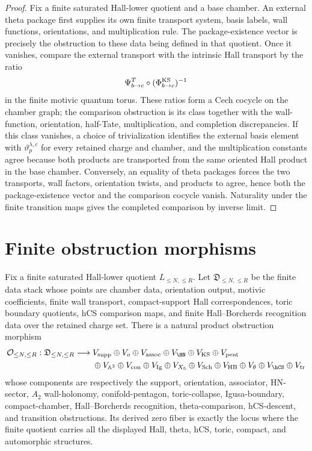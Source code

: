 \begin{proof}
Fix a finite saturated Hall-lower quotient and a base chamber. An
external theta package first supplies its own finite transport system,
basis labels, wall functions, orientations, and multiplication rule.
The package-existence vector is precisely the obstruction to these data
being defined in that quotient. Once it vanishes, compare the external
transport with the intrinsic Hall transport by the ratio
\[
\Psi^{T}_{b\to c}\circ(\Phi^{\mathrm{KS}}_{b\to c})^{-1}
\]
in the finite motivic quantum torus. These ratios form a Cech cocycle
on the chamber graph; the comparison obstruction is its class together
with the wall-function, orientation, half-Tate, multiplication, and
completion discrepancies. If this class vanishes, a choice of
trivialization identifies the external basis element with
\(\vartheta^{\lambda,c}_p\) for every retained charge and chamber, and
the multiplication constants agree because both products are transported
from the same oriented Hall product in the base chamber. Conversely,
an equality of theta packages forces the two transports, wall factors,
orientation twists, and products to agree, hence both the
package-existence vector and the comparison cocycle vanish. Naturality
under the finite transition maps gives the completed comparison by
inverse limit.
\end{proof}

\section{Finite obstruction morphisms}

\begin{theorem}
\label{thm:bps-positive-finite-obstruction-morphism}
Fix a finite saturated Hall-lower quotient \(L_{\leq N,\leq R}\). Let
\(\mathfrak D_{\leq N,\leq R}\) be the finite data stack whose points
are chamber data, orientation output, motivic coefficients, finite
wall transport, compact-support Hall correspondences, toric boundary
quotients, hCS comparison maps, and finite Hall--Borcherds recognition
data over the retained charge set. There is a natural product
obstruction morphism
\[
\mathcal O_{\leq N,\leq R}:
\mathfrak D_{\leq N,\leq R}
\longrightarrow
\begin{aligned}[t]
&V_{\mathrm{supp}}\oplus V_o\oplus V_{\mathrm{assoc}}
\oplus V_{\HN}\oplus V_{\KS}\oplus V_{\mathrm{pent}}\\
&\oplus V_{\mathbb A^3}\oplus V_{\mathrm{con}}
\oplus V_{\mathrm{Ig}}\oplus V_{X_5}\oplus V_{\mathrm{Sch}}
\oplus V_{\mathrm{HB}}\oplus V_\theta\oplus V_{\hCS}
\oplus V_{\mathrm{tr}}
\end{aligned}
\]
whose components are respectively the support, orientation,
associator, HN-sector, \(A_2\) wall-holonomy, conifold-pentagon,
toric-collapse, Igusa-boundary, compact-chamber, Hall--Borcherds
recognition, theta-comparison, hCS-descent, and transition obstructions.
Its derived zero fiber is exactly the locus where the finite quotient
carries all the displayed Hall, theta, hCS, toric, compact, and
automorphic structures.
\end{theorem}

